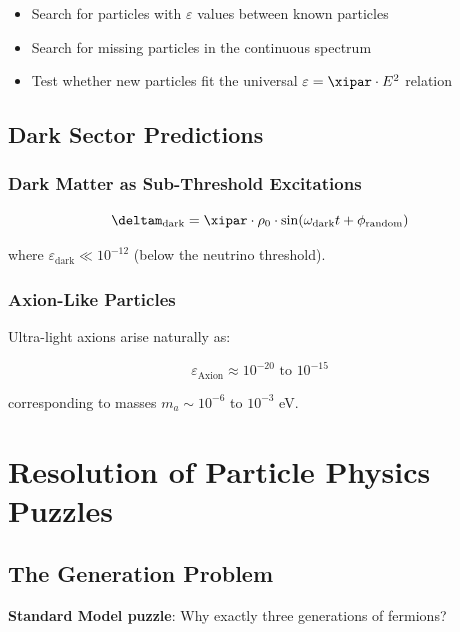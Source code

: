 	\begin{itemize}
		\item Search for particles with $\varepsilon$ values between known particles
		\item Search for missing particles in the continuous spectrum
		\item Test whether new particles fit the universal $\varepsilon = \xipar \cdot E^2$ relation
	\end{itemize}
	
	\subsection{Dark Sector Predictions}
	
	\subsubsection{Dark Matter as Sub-Threshold Excitations}
	
	\begin{equation}
		\deltam_{\text{dark}} = \xipar \cdot \rho_0 \cdot \sin(\omega_{\text{dark}} t + \phi_{\text{random}})
		\label{eq:dark_matter_field}
	\end{equation}
	
	where $\varepsilon_{\text{dark}} \ll 10^{-12}$ (below the neutrino threshold).
	
	\subsubsection{Axion-Like Particles}
	
	Ultra-light axions arise naturally as:
	
	\begin{equation}
		\varepsilon_{\text{Axion}} \approx 10^{-20} \text{ to } 10^{-15}
		\label{eq:axion_epsilon}
	\end{equation}
	
	corresponding to masses $m_a \sim 10^{-6}$ to $10^{-3}$ eV.
	
	\section{Resolution of Particle Physics Puzzles}
	
	\subsection{The Generation Problem}
	
	\textbf{Standard Model puzzle}: Why exactly three generations of fermions?
	

